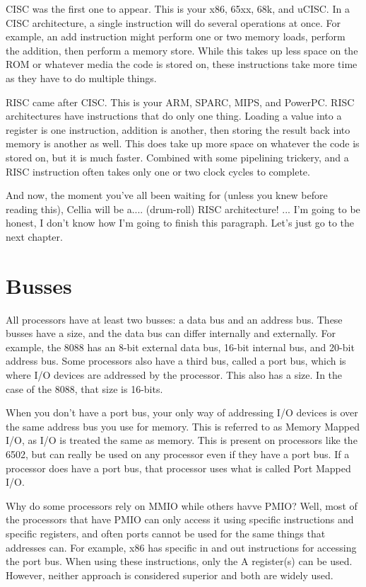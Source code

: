 \documentclass[letterpaper,12pt]{book}
\begin{document}
CISC was the first one to appear. This is your x86, 65xx, 68k, and uCISC. In a CISC architecture, a single instruction will do several operations at once. For example, an add instruction might perform one or two memory loads, perform the addition, then perform a memory store. While this takes up less space on the ROM or whatever media the code is stored on, these instructions take more time as they have to do multiple things.

RISC came after CISC. This is your ARM, SPARC, MIPS, and PowerPC. RISC architectures have instructions that do only one thing. Loading a value into a register is one instruction, addition is another, then storing the result back into memory is another as well. This does take up more space on whatever the code is stored on, but it is much faster. Combined with some pipelining trickery, and a RISC instruction often takes only one or two clock cycles to complete.

And now, the moment you've all been waiting for (unless you knew before reading this), Cellia will be a.... (drum-roll) RISC architecture! ... I'm going to be honest, I don't know how I'm going to finish this paragraph. Let's just go to the next chapter.

\chapter{Busses}

All processors have at least two busses: a data bus and an address bus. These busses have a size, and the data bus can differ internally and externally. For example, the 8088 has an 8-bit external data bus, 16-bit internal bus, and 20-bit address bus. Some processors also have a third bus, called a port bus, which is where I/O devices are addressed by the processor. This also has a size. In the case of the 8088, that size is 16-bits.

When you don't have a port bus, your only way of addressing I/O devices is over the same address bus you use for memory. This is referred to as Memory Mapped I/O, as I/O is treated the same as memory. This is present on processors like the 6502, but can really be used on any processor even if they have a port bus. If a processor does have a port bus, that processor uses what is called Port Mapped I/O.

Why do some processors rely on MMIO while others havve PMIO? Well, most of the processors that have PMIO can only access it using specific instructions and specific registers, and often ports cannot be used for the same things that addresses can. For example, x86 has specific in and out instructions for accessing the port bus. When using these instructions, only the A register(s) can be used. However, neither approach is considered superior and both are widely used.
\end{document}
